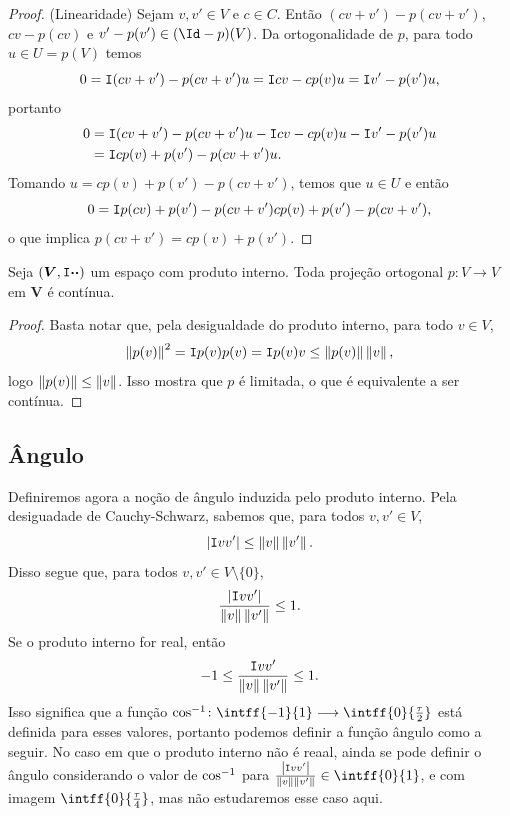 \begin{proof}
(Linearidade) Sejam $v,v' \in V$ e $c \in C$. Então $(cv+v')-p(cv+v')$, $cv-p(cv)$ e $v'-p(v') \in (\Id-p)(V)$. Da ortogonalidade de $p$, para todo $u \in U=p(V)$ temos
	\begin{equation*}
	0 = \mathtt I{(cv+v')-p(cv+v')}{u} = \mathtt I{cv-cp(v)}{u} = \mathtt I{v'-p(v')}{u},
	\end{equation*}
portanto
	\begin{align*}
	0 &= \mathtt I{(cv+v')-p(cv+v')}{u} - \mathtt I{cv-cp(v)}{u} - \mathtt I{v'-p(v')}{u} \\
		&= \mathtt I{cp(v) + p(v') - p(cv+v')}{u}.
	\end{align*}
Tomando $u=cp(v) + p(v') - p(cv+v')$, temos que $u \in U$ %
e então
 	\begin{equation*}
 	0 = \mathtt I{p(cv) + p(v') - p(cv+v')}{cp(v) + p(v') - p(cv+v')},
 	\end{equation*}
o que implica $p(cv+v') = cp(v) + p(v')$.
\end{proof}

\begin{prop}
Seja $(\bm V, \mathtt I{\bm{\cdot}}{\bm{\cdot}})$ um espaço com produto interno. Toda projeção ortogonal $p\colon V \to V$ em $\bm V$ é contínua.
\end{prop}
\begin{proof}
Basta notar que, pela desigualdade do produto interno, para todo $v \in V$,
	\begin{equation*}
	\left\Vert{p(v)}\right\Vert^2 = \mathtt I{p(v)}{p(v)} = \mathtt I{p(v)}{v} \leq \left\Vert{p(v)}\right\Vert\left\Vert{v}\right\Vert,
	\end{equation*}
logo $\left\Vert{p(v)}\right\Vert \leq \left\Vert{v}\right\Vert$. Isso mostra que $p$ é limitada, o que é equivalente a ser contínua.
\end{proof}




\subsection{Ângulo}

Definiremos agora a noção de ângulo induzida pelo produto interno. Pela desiguadade de Cauchy-Schwarz, sabemos que, para todos $v,v' \in V$,
	\begin{equation*}
	\left\vert{\mathtt I{v}{v'}}\right\vert \leq \left\Vert{v}\right\Vert\left\Vert{v'}\right\Vert.
	\end{equation*}
Disso segue que, para todos $v,v' \in V\setminus\{0\}$,
	\begin{equation*}
	\frac{\left\vert{\mathtt I{v}{v'}}\right\vert}{\left\Vert{v}\right\Vert\left\Vert{v'}\right\Vert} \leq 1.
	\end{equation*}
Se o produto interno for real, então
	\begin{equation*}
	-1 \leq \frac{\mathtt I{v}{v'}}{\left\Vert{v}\right\Vert\left\Vert{v'}\right\Vert} \leq 1.
	\end{equation*}
Isso significa que a função $\cos\inv\colon \intff{-1}{1} \to \intff{0}{\frac{\tau}{2}}$ está definida para esses valores, portanto podemos definir a função ângulo como a seguir. No caso em que o produto interno não é reaal, ainda se pode definir o ângulo considerando o valor de $\cos^{-1}$ para $\frac{\abs{\inte{v}{v'}}}{\nor{v}\nor{v'}}\in \intff{0}{1}$, e com imagem $\intff{0}{\frac{\tau}{4}}$, mas não estudaremos esse caso aqui.

